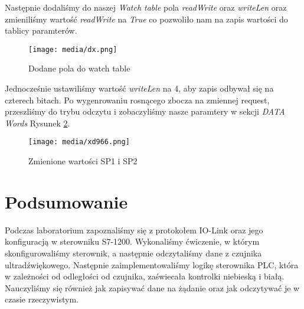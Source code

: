 \documentclass{article}
\begin{document}
Następnie dodaliśmy do naszej \textit{Watch table} pola \textit{readWrite} oraz \textit{writeLen} oraz zmieniliśmy wartość \textit{readWrite} na \textit{True} co pozwoliło nam na zapis wartości do tablicy paramterów.
\begin{figure}[H]
    \centering
    \texttt{[image: media/dx.png]}
    \caption{Dodane pola do watch table}
    \label{fig:watch3}
\end{figure}
Jednocześnie ustawiliśmy wartość \textit{writeLen} na 4, aby zapis odbywał się na czterech bitach. Po wygenrowaniu rosnącego zbocza na zmiennej request, przeszliśmy do trybu odczytu i zobaczyliśmy nasze paramtery w sekcji \textit{DATA Words} Rysunek \ref{fig:watch2}.

\begin{figure}[H]
    \centering
    \texttt{[image: media/xd966.png]}
    \caption{Zmienione wartości SP1 i SP2}
    \label{fig:watch2}
\end{figure}



\section{Podsumowanie}

Podczas laboratorium zapoznaliśmy się z protokołem IO-Link oraz jego konfiguracją w sterowniku S7-1200. Wykonaliśmy ćwiczenie, w którym skonfigurowaliśmy sterownik, a następnie odczytaliśmy dane z czujnika ultradźwiękowego. Następnie zaimplementowaliśmy logikę sterownika PLC, która w zależności od odległości od czujnika, zaświecała kontrolki niebieską i białą. Nauczyliśmy się również jak zapisywać dane na żądanie oraz jak odczytywać je w czasie rzeczywistym.
\end{document}
